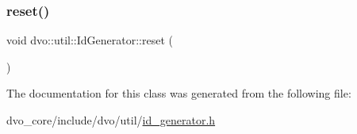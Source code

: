 \mbox{\label{classdvo_1_1util_1_1_id_generator_a3b889077b94492fa69392c4a97ba1448}} 
\subsubsection{\texorpdfstring{reset()}{reset()}}
{\footnotesize\ttfamily void dvo\+::util\+::\+Id\+Generator\+::reset (\begin{DoxyParamCaption}{ }\end{DoxyParamCaption})\hspace{0.3cm}{\ttfamily [inline]}}



The documentation for this class was generated from the following file\+:\begin{DoxyCompactItemize}
\item 
dvo\+\_\+core/include/dvo/util/\mbox{\hyperlink{id__generator_8h}{id\+\_\+generator.\+h}}\end{DoxyCompactItemize}
